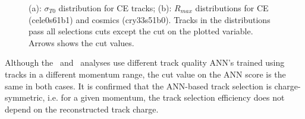 \begin{figure}
  \hspace{-0.6in}
  \caption{
    \label{fig:sigt0_1_and_rmax_1}
    (a): $\sigma_{T0}$ distribution for CE tracks; (b): $R_{max}$  distributions for CE (cele0s61b1) and cosmics (cry33s51b0).
    Tracks in the distributions pass all selections cuts except the cut on the plotted variable. Arrows shows the cut values.
  }
\end{figure}

Although the \MuToEm\ and \MuToEp\ analyses use different track quality ANN's trained using tracks
in a different momentum range, the cut value on the ANN score is the same in both cases.
It is confirmed that the ANN-based track selection is charge-symmetric, i.e. for a given momentum,
the track selection efficiency does not depend on the reconstructed track charge.
